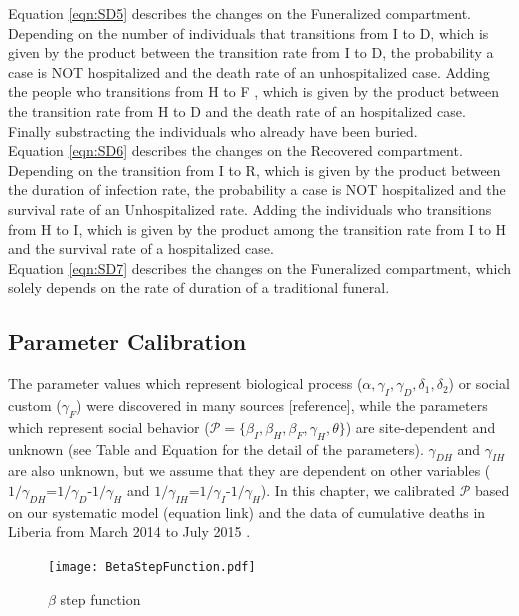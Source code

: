 Equation \ref{eqn:SD5} describes the changes on the Funeralized compartment.  Depending on the number of individuals that transitions from I to D, which is given by the product between the transition rate from I to D, the probability a case is NOT hospitalized and the death rate of an unhospitalized case. Adding the people who transitions from H to F , which is given by the product between the transition rate from H to D and the death rate of an hospitalized case. Finally substracting the individuals who already have been buried.\\

Equation \ref{eqn:SD6} describes the changes on the Recovered compartment. Depending on the transition from I to R, which is given by the product between the duration of infection rate, the probability a case is NOT hospitalized and the survival rate of an Unhospitalized rate. Adding  the individuals who transitions from H to I, which is given by the product among the transition rate from I to H and the survival rate of a hospitalized case.\\

Equation \ref{eqn:SD7} describes the changes on the Funeralized compartment, which solely depends on the rate of duration of a traditional funeral.\\





\subsection{Parameter Calibration}

The parameter values which represent biological process ($\alpha, \gamma_{I}, \gamma_{D}, \delta_{1}, \delta_{2}$) or social custom ($\gamma_{F}$) were discovered in many sources [reference], while the parameters which represent social behavior ($\mathcal{P}=\{\beta_{I}, \beta_{H}, \beta_{F}, \gamma_{H}, \theta\}$) are site-dependent and unknown (see Table and Equation for the detail of the parameters). $\gamma_{DH}$ and $\gamma_{IH}$ are also unknown, but we assume that they are dependent on other variables ($1/\gamma_{DH}$=$1/\gamma_{D}$-$1/\gamma_{H}$ and $1/\gamma_{IH}$=$1/\gamma_{I}$-$1/\gamma_{H}$). In this chapter, we calibrated $\mathcal{P}$ based on our systematic model (equation link) and the data of cumulative deaths in Liberia from March 2014 to July 2015 \cite{CDCData}.\\


\begin{figure}[!h]
  \centering
  \texttt{[image: BetaStepFunction.pdf]}
  \caption{$\beta$ step function} 
\label{fig:BetaStepFunction} 
\end{figure}



